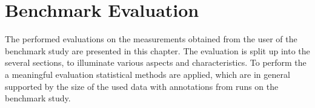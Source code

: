 
\chapter{Benchmark Evaluation}\label{ord:ch5}

The performed evaluations on the measurements obtained from the user of the benchmark study are presented in this chapter.
The evaluation is split up into the several sections, to illuminate various aspects and characteristics.
To perform the a meaningful evaluation statistical methods are applied, which are in general supported by the size of the used data with \getNumberBenchmarkAnnotations \space annotations from \getNumberBenchmarkRuns \space runs on the benchmark study.







